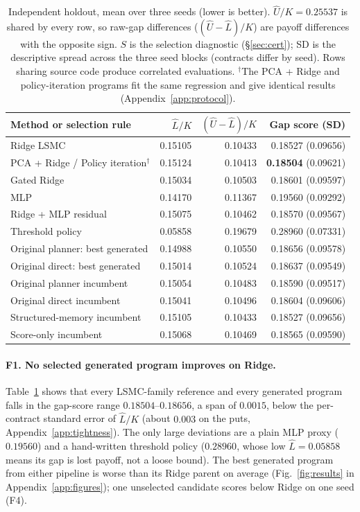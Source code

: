 \documentclass{article}
\begin{document}
\begin{table}[t]
\caption{Independent holdout, mean over three seeds (lower is better). $\hat U/K = 0.25537$ is shared by every row, so raw-gap differences ($(\hat U{-}\hat L)/K$) are payoff differences with the opposite sign. $S$ is the selection diagnostic (\S\ref{sec:cert}); SD is the descriptive spread across the three seed blocks (contracts differ by seed). Rows sharing source code produce correlated evaluations. $^\dagger$The PCA + Ridge and policy-iteration programs fit the same regression and give identical results (Appendix~\ref{app:protocol}).}
\label{tab:main}
\centering
\footnotesize
\begin{tabular}{lrrr}
\toprule
Method or selection rule & $\hat L/K$ & $(\hat U{-}\hat L)/K$ & Gap score (SD) \\
\midrule
Ridge LSMC & 0.15105 & 0.10433 & 0.18527 (0.09656) \\
PCA + Ridge / Policy iteration$^\dagger$ & 0.15124 & 0.10413 & \textbf{0.18504} (0.09621) \\
Gated Ridge & 0.15034 & 0.10503 & 0.18601 (0.09597) \\
MLP & 0.14170 & 0.11367 & 0.19560 (0.09292) \\
Ridge + MLP residual & 0.15075 & 0.10462 & 0.18570 (0.09567) \\
Threshold policy & 0.05858 & 0.19679 & 0.28960 (0.07331) \\
\midrule
Original planner: best generated & 0.14988 & 0.10550 & 0.18656 (0.09578) \\
Original direct: best generated & 0.15014 & 0.10524 & 0.18637 (0.09549) \\
Original planner incumbent & 0.15054 & 0.10483 & 0.18590 (0.09517) \\
Original direct incumbent & 0.15041 & 0.10496 & 0.18604 (0.09606) \\
Structured-memory incumbent & 0.15105 & 0.10433 & 0.18527 (0.09656) \\
Score-only incumbent & 0.15068 & 0.10469 & 0.18565 (0.09590) \\
\bottomrule
\end{tabular}
\end{table}

\paragraph{F1. No selected generated program improves on Ridge.}
Table~\ref{tab:main} shows that every LSMC-family reference and every generated program falls in the gap-score range $0.18504$--$0.18656$, a span of $0.0015$, below the per-contract standard error of $\hat L/K$ (about $0.003$ on the puts, Appendix~\ref{app:tightness}). The only large deviations are a plain MLP proxy ($0.19560$) and a hand-written threshold policy ($0.28960$, whose low $\hat L = 0.05858$ means its gap is lost payoff, not a loose bound). The best generated program from either pipeline is worse than its Ridge parent on average (Fig.~\ref{fig:results} in Appendix~\ref{app:figures}); one unselected candidate scores below Ridge on one seed (F4).
\end{document}

